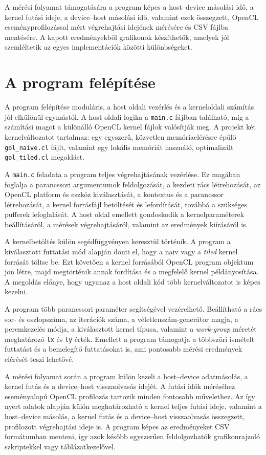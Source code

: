 \documentclass[12pt,a4paper]{article}
\begin{document}
A mérési folyamat támogatására a program képes a host--device másolási idő, a kernel futási ideje, a device--host másolási idő, valamint ezek összegzett, OpenCL eseményprofilozással mért végrehajtási idejének mérésére és CSV fájlba mentésére. A kapott eredményekből grafikonok készíthetők, amelyek jól szemléltetik az egyes implementációk közötti különbségeket.

\section{A program felépítése}

A program felépítése moduláris, a host oldali vezérlés és a kerneloldali számítás jól elkülönül egymástól. A host oldali logika a \texttt{main.c} fájlban található, míg a számítási magot a különálló OpenCL kernel fájlok valósítják meg. A projekt két kernelváltozatot tartalmaz: egy egyszerű, közvetlen memóriaelérésre épülő \texttt{gol\_naive.cl} fájlt, valamint egy lokális memóriát használó, optimalizált \texttt{gol\_tiled.cl} megoldást.

A \texttt{main.c} feladata a program teljes végrehajtásának vezérlése. Ez magában foglalja a parancssori argumentumok feldolgozását, a kezdeti rács létrehozását, az OpenCL platform és eszköz kiválasztását, a kontextus és a parancssor létrehozását, a kernel forrásfájl betöltését és lefordítását, továbbá a szükséges pufferek lefoglalását. A host oldal emellett gondoskodik a kernelparaméterek beállításáról, a mérések végrehajtásáról, valamint az eredmények kiírásáról is.

A kernelbetöltés külön segédfüggvényen keresztül történik. A program a kiválasztott futtatási mód alapján dönti el, hogy a naiv vagy a \emph{tiled} kernel forrását töltse be. Ezt követően a kernel forrásából OpenCL program objektum jön létre, majd megtörténik annak fordítása és a megfelelő kernel példányosítása. A megoldás előnye, hogy ugyanaz a host oldali kód több kernelváltozatot is képes kezelni.

A program több parancssori paraméter segítségével vezérelhető. Beállítható a rács sor- és oszlopszáma, az iterációk száma, a véletlenszám-generátor magja, a peremkezelés módja, a kiválasztott kernel típusa, valamint a \emph{work-group} méretét meghatározó \texttt{lx} és \texttt{ly} érték. Emellett a program támogatja a többszöri ismételt futtatást és a bemelegítő futtatásokat is, ami pontosabb mérési eredmények elérését teszi lehetővé.

A mérési folyamat során a program külön kezeli a host--device adatmásolás, a kernel futás és a device--host visszaolvasás idejét. A futási idők méréséhez eseményalapú OpenCL profilozás tartozik minden fontosabb művelethez. Az így nyert adatok alapján külön meghatározható a kernel teljes futási ideje, valamint a host--device másolás, a kernel futás és a device--host visszaolvasás összegzett, profilozott végrehajtási ideje is. A program képes az eredményeket CSV formátumban menteni, így azok később egyszerűen feldolgozhatók grafikonrajzoló szkriptekkel vagy táblázatkezelővel.
\end{document}
